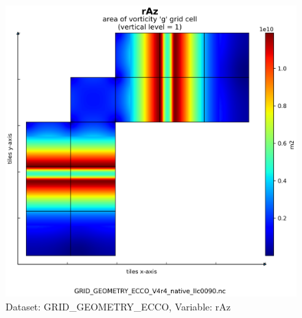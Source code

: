 \begin{figure}[H]
\centering
\includegraphics[scale=0.55]{../images/plots/native_plots_coords/Geometry_Parameters_for_the_Lat-Lon-Cap_90_(llc90)_Native_Model_Grid_(Version_4_Release_4)/rAz.png}
\caption{Dataset: GRID\_GEOMETRY\_ECCO, Variable: rAz}
\label{tab:table-GRID_GEOMETRY_ECCO_rAz-Plot}
\end{figure}
\newpage
\pagebreak
